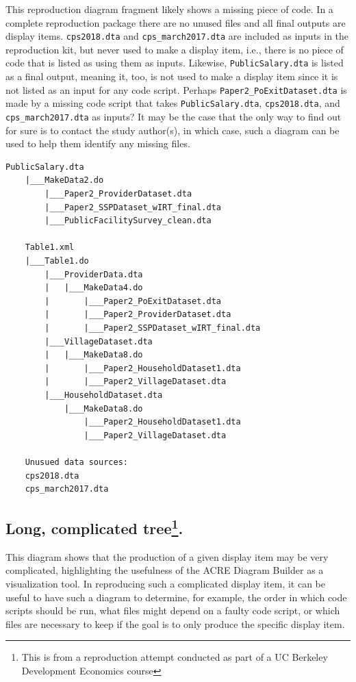 \documentclass[]{book}
\begin{document}
This reproduction diagram fragment likely shows a missing piece of code. In a complete reproduction package there are no unused files and all final outputs are display items. \texttt{cps2018.dta} and \texttt{cps\_march2017.dta} are included as inputs in the reproduction kit, but never used to make a display item, i.e., there is no piece of code that is listed as using them as inputs. Likewise, \texttt{PublicSalary.dta} is listed as a final output, meaning it, too, is not used to make a display item since it is not listed as an input for any code script. Perhaps \texttt{Paper2\_PoExitDataset.dta} is made by a missing code script that takes \texttt{PublicSalary.dta}, \texttt{cps2018.dta}, and \texttt{cps\_march2017.dta} as inputs? It may be the case that the only way to find out for sure is to contact the study author(s), in which case, such a diagram can be used to help them identify any missing files.

\begin{verbatim}
PublicSalary.dta
    |___MakeData2.do
        |___Paper2_ProviderDataset.dta
        |___Paper2_SSPDataset_wIRT_final.dta
        |___PublicFacilitySurvey_clean.dta

    Table1.xml
    |___Table1.do
        |___ProviderData.dta
        |   |___MakeData4.do
        |       |___Paper2_PoExitDataset.dta
        |       |___Paper2_ProviderDataset.dta
        |       |___Paper2_SSPDataset_wIRT_final.dta
        |___VillageDataset.dta
        |   |___MakeData8.do
        |       |___Paper2_HouseholdDataset1.dta
        |       |___Paper2_VillageDataset.dta
        |___HouseholdDataset.dta
            |___MakeData8.do
                |___Paper2_HouseholdDataset1.dta
                |___Paper2_VillageDataset.dta

    Unusued data sources:
    cps2018.dta
    cps_march2017.dta  
\end{verbatim}

\hypertarget{long-complicated-tree.}{%
\subsection[Long, complicated tree.]{\texorpdfstring{Long, complicated tree\footnote{This is from a reproduction attempt conducted as part of a UC Berkeley Development Economics course}.}{Long, complicated tree.}}\label{long-complicated-tree.}}

This diagram shows that the production of a given display item may be very complicated, highlighting the usefulness of the ACRE Diagram Builder as a visualization tool. In reproducing such a complicated display item, it can be useful to have such a diagram to determine, for example, the order in which code scripts should be run, what files might depend on a faulty code script, or which files are necessary to keep if the goal is to only produce the specific display item.
\end{document}
